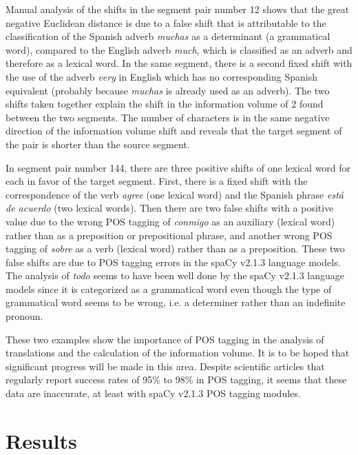 \documentclass[output=paper]{langsci/langscibook}
\begin{document}
Manual analysis of the shifts in the segment pair number 12 shows that the great negative Euclidean distance is due to a false shift that is attributable to the classification of the Spanish adverb \textit{muchas} as a determinant (a grammatical word), compared to the English adverb \textit{much}, which is classified as an adverb and therefore as a lexical word. In the same segment, there is a second fixed shift with the use of the adverb \textit{very} in English which has no corresponding Spanish equivalent (probably because \textit{muchas} is already used as an adverb). The two shifts taken together explain the shift in the information volume of 2 found between the two segments. The number of characters is in the same negative direction of the information volume shift and reveals that the target segment of the pair is shorter than the source segment.

In segment pair number 144, there are three positive shifts of one lexical word for each in favor of the target segment. First, there is a fixed shift with the correspondence of the verb \textit{agree} (one lexical word) and the Spanish phrase \textit{está de acuerdo} (two lexical words). Then there are two false shifts with a positive value due to the wrong POS tagging of \textit{conmigo} as an auxiliary (lexical word) rather than as a preposition or prepositional phrase, and another wrong POS tagging of \textit{sobre} as a verb (lexical word) rather than as a preposition. These two false shifts are due to POS tagging errors in the spaCy v2.1.3 language models. The analysis of \textit{todo} seems to have been well done by the spaCy v2.1.3 language models since it is categorized as a grammatical word even though the type of grammatical word seems to be wrong, i.e. a determiner rather than an indefinite pronoun. 

These two examples show the importance of POS tagging in the analysis of translations and the calculation of the information volume. It is to be hoped that significant progress will be made in this area. Despite scientific articles that regularly report success rates of 95\% to 98\% in POS tagging, it seems that these data are inaccurate, at least with spaCy v2.1.3 POS tagging modules.

\section{Results}\label{ep:res}
\end{document}
